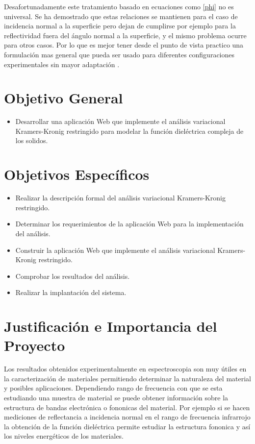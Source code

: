 \documentclass[a4paper,openright,12pt]{book}
\begin{document}
Desafortunadamente este tratamiento basado en ecuaciones como \ref{phi} no es universal. Se ha demostrado que estas relaciones se mantienen para el caso de incidencia normal a la superficie pero dejan de cumplirse por ejemplo para la reflectividad fuera del ángulo normal a la superficie, y el mismo problema ocurre para otros casos. Por lo que es mejor tener desde el punto de vista practico una formulación mas general que pueda ser usado para diferentes configuraciones experimentales sin mayor adaptación \cite{constrained}.


\section{Objetivo General}

\begin{itemize}
\item Desarrollar una aplicación Web que implemente el análisis variacional Kramers-Kronig restringido para modelar la función dieléctrica compleja de los solidos.
\end{itemize}

\section{Objetivos Específicos}
\begin{itemize}
\item Realizar la descripción formal del análisis variacional Kramers-Kronig restringido.
\item Determinar los requerimientos de la aplicación Web para la implementación del análisis.
\item Construir la aplicación Web que implemente el análisis variacional Kramers-Kronig restringido.
\item Comprobar los resultados del análisis.
\item Realizar la implantación del sistema.
\end{itemize}


\section{Justificación e Importancia del Proyecto}

Los resultados obtenidos experimentalmente en espectroscopia son muy útiles en la caracterización de materiales permitiendo determinar la naturaleza del material y posibles aplicaciones. Dependiendo rango de frecuencia con que se esta estudiando una muestra de material se puede obtener información sobre la estructura de bandas electrónica o fononicas del material. Por ejemplo si se hacen mediciones de reflectancia a incidencia normal en el rango de frecuencia infrarrojo la obtención de la función dieléctrica permite estudiar la estructura fononica y así los niveles energéticos de los materiales\cite{SolidStatePhysics}. 
\end{document}
